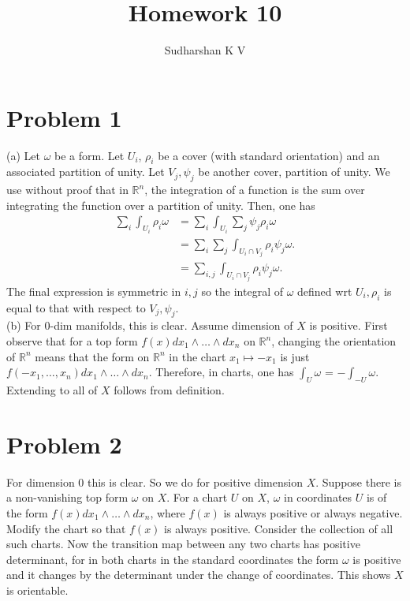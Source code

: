 \documentclass{amsart}
\title{Homework 10}
\author{Sudharshan K V}
\numberwithin{equation}{section}
\theoremstyle{plain}
\theoremstyle{definition}
\theoremstyle{remark}
\renewcommand{\_}[2]{\underbrace{#1}_{#2}}
\renewcommand{\^}[2]{\overbrace{#1}_{#2}}
\newcommand{\R}{\mathbb{R}}
\begin{document}
\maketitle

\section*{Problem 1}
(a) Let $\omega$ be a form. Let $U_i$, $\rho_i$ be a cover (with standard orientation) and an associated partition of unity. Let $V_j, \psi_j$ be another cover, partition of unity. We use without proof that in $\R^n$, the integration of a function is the sum over integrating the function over a partition of unity. Then, one has
\begin{align*}
  \sum_i \int_{U_i}\rho_i\omega &= \sum_i \int_{U_i} \sum_j\psi_j\rho_i\omega\\
                                &= \sum_i \sum_j \int_{U_i\cap V_j} \rho_i\psi_j \omega.\\
                                &= \sum_{i,j} \int_{U_i\cap V_j} \rho_i\psi_j\omega.
\end{align*}
The final expression is symmetric in $i,j$ so the integral of $\omega$ defined wrt $U_i, \rho_i$ is equal to that with respect to $V_j, \psi_j$. 
\\

(b) For $0$-dim manifolds, this is clear. Assume dimension of $X$ is positive. First observe that for a top form $f(x) dx_1\wedge \dots \wedge dx_n$ on $\R^n$, changing the orientation of $\R^n$ means that the form on $\R^n$ in the chart $x_1 \mapsto -x_1$ is just $f(-x_1, \dots, x_n) dx_1 \wedge \dots \wedge dx_n$. Therefore, in charts, one has $\int_U \omega$ = $-\int_{-U}\omega$. Extending to all of $X$ follows from definition.

\section*{Problem 2}
For dimension $0$ this is clear. So we do for positive dimension $X$. Suppose there is a non-vanishing top form $\omega$ on $X$. For a chart $U$ on $X$, $\omega$ in coordinates $U$ is of the form $f(x) dx_1 \wedge \dots \wedge dx_n$, where $f(x)$ is always positive or always negative. Modify the chart so that $f(x)$ is always positive. Consider the collection of all such charts. Now the transition map between any two charts has positive determinant, for in both charts in the standard coordinates the form $\omega$ is positive and it changes by the determinant under the change of coordinates. This shows $X$ is orientable.\\
\end{document}
